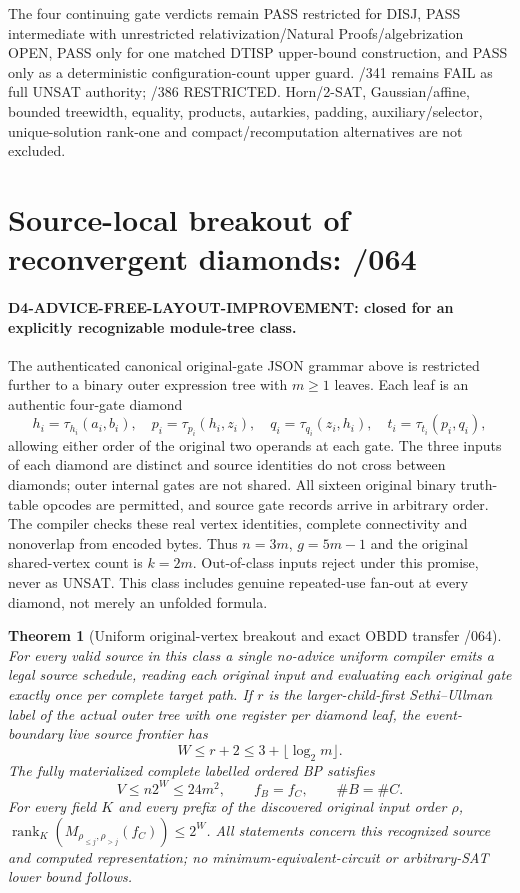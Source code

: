 \documentclass[11pt]{article}
\newtheorem{theorem}{Theorem}
\begin{document}
The four continuing gate verdicts remain PASS restricted for DISJ, PASS intermediate with unrestricted relativization/Natural Proofs/algebrization OPEN, PASS only for one matched DTISP upper-bound construction, and PASS only as a deterministic configuration-count upper guard. /341 remains FAIL as full UNSAT authority; /386 RESTRICTED. Horn/2-SAT, Gaussian/affine, bounded treewidth, equality, products, autarkies, padding, auxiliary/selector, unique-solution rank-one and compact/recomputation alternatives are not excluded.


\section{Source-local breakout of reconvergent diamonds: /064}

\paragraph{D4-ADVICE-FREE-LAYOUT-IMPROVEMENT: closed for an explicitly recognizable module-tree class.}
The authenticated canonical original-gate JSON grammar above is restricted further to a binary outer expression tree with $m\ge1$ leaves. Each leaf is an authentic four-gate diamond
\[
h_i=\tau_{h_i}(a_i,b_i),\quad p_i=\tau_{p_i}(h_i,z_i),\quad
q_i=\tau_{q_i}(z_i,h_i),\quad t_i=\tau_{t_i}(p_i,q_i),
\]
allowing either order of the original two operands at each gate. The three inputs of each diamond are distinct and source identities do not cross between diamonds; outer internal gates are not shared. All sixteen original binary truth-table opcodes are permitted, and source gate records arrive in arbitrary order. The compiler checks these real vertex identities, complete connectivity and nonoverlap from encoded bytes. Thus $n=3m$, $g=5m-1$ and the original shared-vertex count is $k=2m$. Out-of-class inputs reject under this promise, never as UNSAT. This class includes genuine repeated-use fan-out at every diamond, not merely an unfolded formula.

\begin{theorem}[Uniform original-vertex breakout and exact OBDD transfer /064]
For every valid source in this class a single no-advice uniform compiler emits a legal source schedule, reading each original input and evaluating each original gate exactly once per complete target path. If $r$ is the larger-child-first Sethi--Ullman label of the actual outer tree with one register per diamond leaf, the event-boundary live source frontier has
\[
W\le r+2\le3+\lfloor\log_2m\rfloor .
\]
The fully materialized complete labelled ordered BP satisfies
\[
V\le n2^W\le24m^2,\qquad f_B=f_C,\qquad \# B=\# C.
\]
For every field $K$ and every prefix of the discovered original input order $\rho$, $\operatorname{rank}_K(M_{\rho_{\le j},\rho_{>j}}(f_C))\le2^W$. All statements concern this recognized source and computed representation; no minimum-equivalent-circuit or arbitrary-SAT lower bound follows.
\end{theorem}
\end{document}
